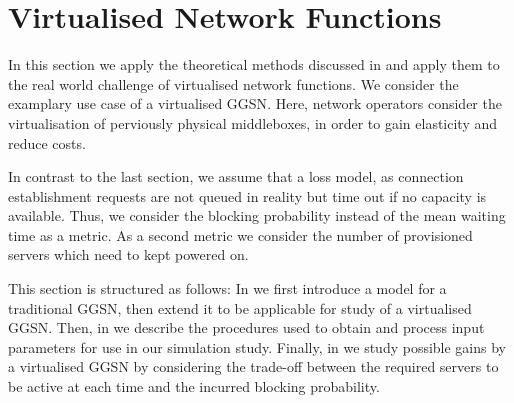 \section{Virtualised Network Functions}\label{sec:cloud:virtualized_network_functions}

\newcommand{\blockingprobability}[0]{p_B}
\newcommand{\maxServers}[0]{S_{\max}}
In this section we apply the theoretical methods discussed in  and apply them to the real world challenge of virtualised network functions.
We consider the examplary use case of a virtualised \gls{GGSN}.
Here, network operators consider the virtualisation of perviously physical middleboxes, in order to gain elasticity and reduce costs.

In contrast to the last section, we assume that a loss model, as connection establishment requests are not queued in reality but time out if no capacity is available.
Thus, we consider the blocking probability instead of the mean waiting time as a metric.
As a second metric we consider the number of provisioned servers which need to kept powered on. 

This section is structured as follows:
In  we first introduce a model for a traditional \gls{GGSN}, then extend it to be applicable for study of a virtualised \gls{GGSN}.
Then, in  we describe the procedures used to obtain and process input parameters for use in our simulation study.
Finally, in  we study possible gains by a virtualised \gls{GGSN} by considering the trade-off between the required servers to be active at each time and the incurred blocking probability. 



